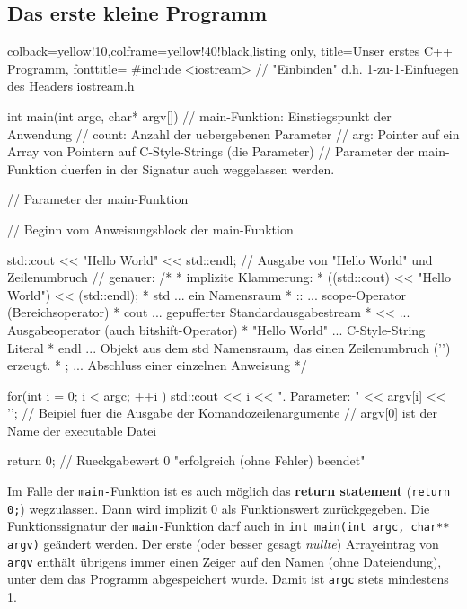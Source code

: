 \documentclass[a4paper]{report}
\begin{document}
\subsection{Das erste kleine Programm}
\begin{tcblisting}{colback=yellow!10,colframe=yellow!40!black,listing only,
		title=Unser erstes C++ Programm, fonttitle=\bfseries}
#include <iostream>
// "Einbinden" d.h. 1-zu-1-Einfuegen des Headers iostream.h

int main(int argc, char* argv[])
// main-Funktion: Einstiegspunkt der Anwendung
// count: Anzahl der uebergebenen Parameter 
// arg: Pointer auf ein Array von Pointern auf C-Style-Strings (die Parameter)
// Parameter der main-Funktion duerfen in der Signatur auch weggelassen werden.

// Parameter der main-Funktion 
{   // Beginn vom Anweisungsblock der main-Funktion
	
	std::cout << "Hello World" << std::endl;
	// Ausgabe von "Hello World" und Zeilenumbruch
	// genauer:
	/*
	* implizite Klammerung:
	* ((std::cout) << "Hello World") << (std::endl);
	* std              ... ein Namensraum
	* ::               ... scope-Operator (Bereichsoperator)
	* cout            ... gepufferter Standardausgabestream
	* <<               ... Ausgabeoperator (auch bitshift-Operator)
	* "Hello World"    ... C-Style-String Literal
	* endl             ... Objekt aus dem std Namensraum, das einen Zeilenumbruch ('\n') erzeugt.
	* ;                ... Abschluss einer einzelnen Anweisung
	*/
	
	for(int i = 0; i < argc; ++i ){
		std::cout << i << ". Parameter:  " << argv[i] << '\n';
	} // Beipiel fuer die Ausgabe der Komandozeilenargumente
	// argv[0] ist der Name der executable Datei
	
	return 0; // Rueckgabewert 0 "erfolgreich (ohne Fehler) beendet"
}
\end{tcblisting}
Im Falle der \texttt{main-}Funktion ist es auch möglich das \textbf{return statement} (\texttt{return 0;}) wegzulassen. Dann wird implizit 0 als Funktionswert zurückgegeben. Die Funktionssignatur der \texttt{main-}Funktion darf auch in \texttt{int main(int argc, char** argv)} geändert werden. Der erste (oder besser gesagt \textit{nullte}) Arrayeintrag von \texttt{argv} enthält übrigens immer einen Zeiger auf den Namen (ohne Dateiendung), unter dem das Programm abgespeichert wurde. Damit ist \texttt{argc} stets mindestens 1. 
\end{document}
